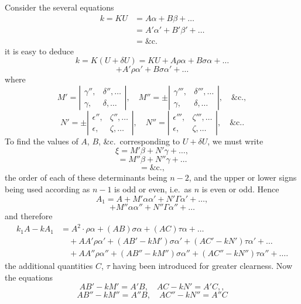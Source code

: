 \documentclass[11pt,a4paper]{article}
\theoremstyle{plain}
\theoremstyle{definition}
\theoremstyle{remark}
\begin{document}
Consider the several equations
\begin{align*}
k = KU &= A\alpha + B\beta + \ldots \\
&= A'\alpha' + B'\beta' + \ldots \\
&= \&\text{c.}
\end{align*}
it is easy to deduce
\[
k = K(U+\delta U) = KU + A\rho\alpha + B\sigma\alpha + \ldots
\]
\[
+ A'\rho\alpha' + B\sigma\alpha' + \ldots
\]
where
\[
M' = \left|\begin{array}{cc}
\gamma'', & \delta'', \ldots \\
\gamma, & \delta, \ldots
\end{array}\right|, \quad
M'' = \pm\left|\begin{array}{cc}
\gamma''', & \delta''', \ldots \\
\gamma, & \delta, \ldots
\end{array}\right|, \quad \&\text{c.}
\tag{72},
\]
\[
N' = \pm\left|\begin{array}{cc}
\epsilon'', & \zeta'', \ldots \\
\epsilon, & \zeta, \ldots
\end{array}\right|, \quad
N'' = \left|\begin{array}{cc}
\epsilon''', & \zeta''', \ldots \\
\epsilon, & \zeta, \ldots
\end{array}\right|, \quad \&\text{c.}
\tag{73}.
\]
To find the values of $A$, $B$, \&c.\ corresponding to $U+\delta U$, we must write
\[
\xi = M'\beta + N'\gamma + \ldots
\tag{74},
\]
\[
= M''\beta + N''\gamma + \ldots
\]
\[
= \&\text{c.}
\tag{75},
\]
the order of each of these determinants being $n-2$, and the upper or lower signs
being used according as $n-1$ is odd or even, i.e.\ as $n$ is even or odd. Hence
\[
A_1 = A + M'\alpha\alpha' + N'\Gamma\alpha' + \ldots
\tag{76},
\]
\[
+ M''\alpha\alpha'' + N''\Gamma\alpha'' + \ldots
\]
and therefore
\begin{align*}
k_1A - kA_1 &= A^2\cdot\rho\alpha + (AB)\sigma\alpha + (AC)\tau\alpha + \ldots \\
&\quad + AA'\rho\alpha' + (AB' - kM')\sigma\alpha' + (AC' - kN')\tau\alpha' + \ldots \\
&\quad + AA''\rho\alpha'' + (AB'' - kM'')\sigma\alpha'' + (AC'' - kN'')\tau\alpha'' + \ldots
\tag{77}.
\end{align*}
the additional quantities $C$, $\tau$ having been introduced for greater clearness. Now the
equations
\[
AB' - kM' = A'B, \quad AC - kN' = A'C, \tag{78},
\]
\[
AB'' - kM'' = A''B, \quad AC'' - kN'' = A''C
\]
\end{document}
